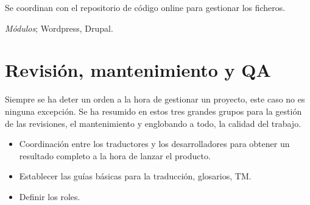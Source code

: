 \documentclass[11pt]{article}
\begin{document}
\par Se coordinan con el repositorio de c\'odigo online para gestionar los ficheros.

\emph{M\'odulos}; Wordpress, Drupal.

\section{Revisi\'on, mantenimiento y QA}

\par Siempre se ha deter un orden a la hora de gestionar un proyecto, este caso no es ninguna excepci\'on. Se ha resumido en estos tres grandes grupos para la gesti\'on de las revisiones, el mantenimiento y englobando a todo, la calidad del trabajo.

\begin{itemize}
	\item Coordinaci\'on entre los traductores y los desarrolladores para obtener un resultado completo a la hora de lanzar el producto.
	\item Establecer las gu\'ias b\'asicas para la traducci\'on, glosarios, TM.
	\item Definir los roles.
\end{itemize}
\end{document}
